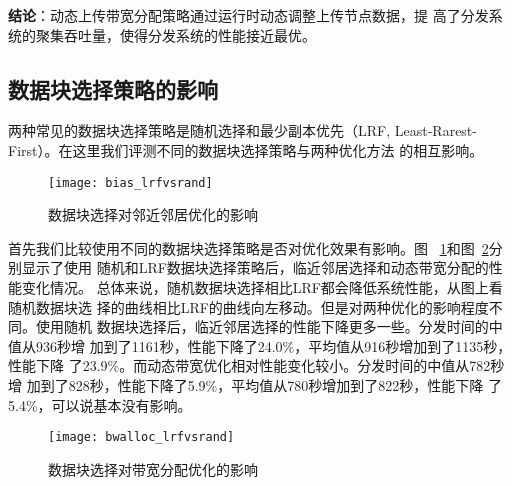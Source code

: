 \textbf{结论}：动态上传带宽分配策略通过运行时动态调整上传节点数据，提
高了分发系统的聚集吞吐量，使得分发系统的性能接近最优。

%


\subsection{数据块选择策略的影响}

两种常见的数据块选择策略是随机选择和最少副本优先（LRF,
Least-Rarest-First）。在这里我们评测不同的数据块选择策略与两种优化方法
的相互影响。

\begin{figure}
  \centering
  \begin{minipage}{0.6\linewidth}
    \centering
    \texttt{[image: bias\_lrfvsrand]}
    \caption{数据块选择对邻近邻居优化的影响}
    \label{fig:bias_lrfvsrand}
  \end{minipage}
\end{figure}

首先我们比较使用不同的数据块选择策略是否对优化效果有影响。图~
\ref{fig:bias_lrfvsrand}和图~\ref{fig:bwalloc_lrfvsrand}分别显示了使用
随机和LRF数据块选择策略后，临近邻居选择和动态带宽分配的性能变化情况。
总体来说，随机数据块选择相比LRF都会降低系统性能，从图上看随机数据块选
择的曲线相比LRF的曲线向左移动。但是对两种优化的影响程度不同。使用随机
数据块选择后，临近邻居选择的性能下降更多一些。分发时间的中值从936秒增
加到了1161秒，性能下降了24.0\%，平均值从916秒增加到了1135秒，性能下降
了23.9\%。而动态带宽优化相对性能变化较小。分发时间的中值从782秒增
加到了828秒，性能下降了5.9\%，平均值从780秒增加到了822秒，性能下降
了5.4\%，可以说基本没有影响。

\begin{figure}
  \centering
  \begin{minipage}{0.6\linewidth}
    \centering
    \texttt{[image: bwalloc\_lrfvsrand]}
    \caption{数据块选择对带宽分配优化的影响}
    \label{fig:bwalloc_lrfvsrand}
  \end{minipage}
\end{figure}

